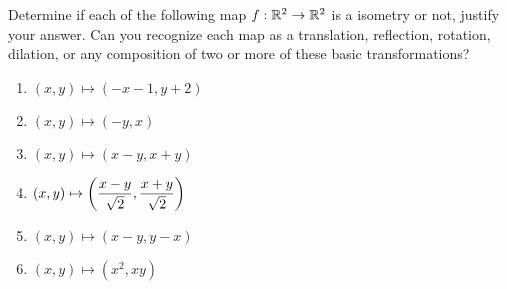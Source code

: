 \documentclass{subfiles}
\begin{document}
Determine if each of the following map $f: \mathbb{R}^2\to \mathbb{R}^2$ is a isometry or not, justify your answer. Can you recognize each map as a translation, reflection, rotation, dilation, or any composition of two or more of these basic transformations?

\begin{enumerate}
	\item $(x,y)\mapsto (-x-1, y+2)$
	\item $(x,y)\mapsto (-y, x)$
	\item $(x,y)\mapsto (x-y, x+y)$
	\item $(x,y)\mapsto \left(\displaystyle\frac{x-y}{\sqrt{2}}, \displaystyle\frac{x+y}{\sqrt{2}}\right)$
	\item $(x,y)\mapsto (x-y, y-x)$
	\item $(x,y)\mapsto (x^2, xy)$
\end{enumerate}
\end{document}
